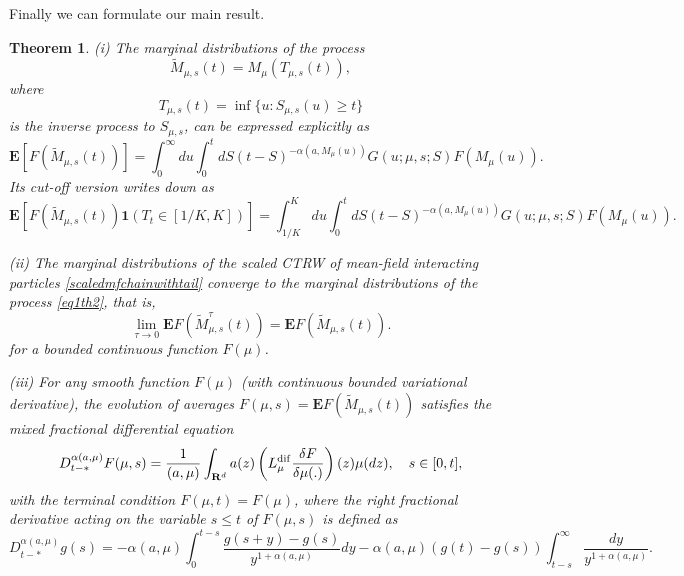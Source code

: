 \documentclass[12pt]{article}
\def\E{\mathbf{E}}
\def\R{\mathbf{R}}
\def\1{\mathbf{1}}
\def\al{\alpha}
\def\de{\delta}
\numberwithin{equation}{section}
\newtheorem{theorem}{Theorem}
\begin{document}
Finally we can formulate our main result.

 \begin{theorem}
\label{th2}
(i) The marginal distributions of the process
 \begin{equation}
\label{eq1th2}
\tilde M_{\mu,s}(t)= M_{\mu}(T_{\mu,s}(t)),
\end{equation}
where
\[
T_{\mu,s}(t)=\inf \{ u: S_{\mu,s} (u) \ge t\}
\]
 is the inverse process to $S_{\mu,s}$,
can be expressed explicitly as
\begin{equation}
 \label{eq11th2}
\E [F(\tilde M_{\mu,s}(t))]
 =\int_{0}^{\infty} du \int_0^t dS  (t-S)^{-\al (a, M_{\mu}(u))} G(u;\mu,s; S) F(M_{\mu}(u)).
\end{equation}
Its cut-off version writes down as
\begin{equation}
 \label{eq12th2}
\E [F(\tilde M_{\mu,s}(t))\1(T_t\in [1/K,K])]
 =\int_{1/K}^{K} du \int_0^t dS  (t-S)^{-\al (a, M_{\mu}(u))} G(u;\mu,s; S) F(M_{\mu}(u)).
\end{equation}

(ii) The marginal distributions of the scaled CTRW of mean-field interacting
particles \eqref{scaledmfchainwithtail} converge
 to the marginal distributions of the process \eqref{eq1th2},
that is,
 \begin{equation}
\label{eq3th2}
\lim_{\tau \to 0}  \E F(\tilde M^{\tau}_{\mu,s}(t))= \E F(\tilde M_{\mu,s}(t)).
\end{equation}
for a bounded continuous function $F(\mu)$.

(iii) For any smooth function $F(\mu)$ (with continuous bounded variational derivative), the evolution
of averages $F(\mu,s)=\E F(\tilde M_{\mu,s}(t))$ satisfies the mixed fractional differential equation
 \begin{equation}
\label{eq4th2}
D_{t-*}^{\al (a,\mu)}F(\mu,s)
= \frac{1}{(a,\mu)}\int_{\R^d} a(z)\left(L_{\mu}^{\rm dif} \frac{\de F}{\de \mu(.)}\right)(z)\mu(dz),
\quad s \in [0,t],
\end{equation}
with the terminal condition $F(\mu,t)=F(\mu)$,
where the right fractional derivative acting on the variable $s\le t$ of $F(\mu,s)$ is defined as
 \begin{equation}
\label{eq5th2}
D_{t-*}^{\al(a,\mu)}g(s) = -\al (a,\mu) \int_0^{t-s} \frac {g(s+y)-g(s)}{y^{1+\al (a,\mu)}} dy
-\al (a,\mu) (g(t)-g(s)) \int_{t-s}^{\infty}\frac {dy}{y^{1+\al (a,\mu)}}.
\end{equation}
\end{theorem}
\end{document}
